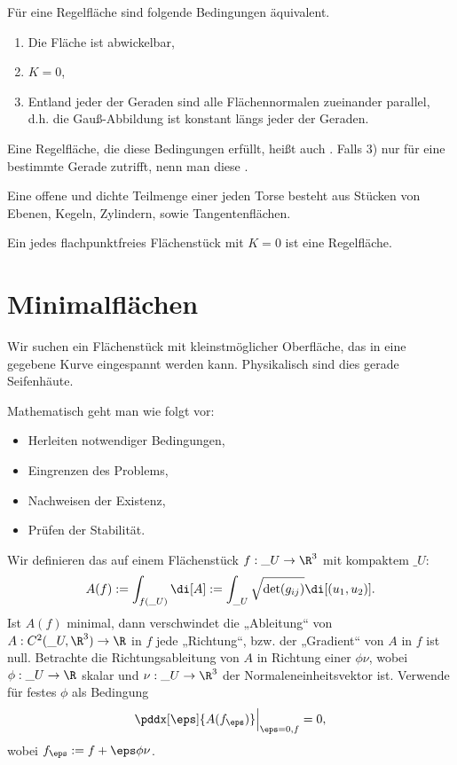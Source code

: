\begin{st}
	Für eine Regelfläche sind folgende Bedingungen äquivalent.
	\begin{enumerate}[1)]
		\item
			Die Fläche ist abwickelbar,
		\item
			$K = 0$,
		\item
			Entland jeder der Geraden sind alle Flächennormalen zueinander parallel, d.h. die Gauß-Abbildung ist konstant längs jeder der Geraden.
	\end{enumerate}
	Eine Regelfläche, die diese Bedingungen erfüllt, heißt auch .
	Falls 3) nur für eine bestimmte Gerade zutrifft, nenn man diese .

	Eine offene und dichte Teilmenge einer jeden Torse besteht aus Stücken von Ebenen, Kegeln, Zylindern, sowie Tangentenflächen.

	Ein jedes flachpunktfreies Flächenstück mit $K = 0$ ist eine Regelfläche.
\end{st}



\section{Minimalflächen}

Wir suchen ein Flächenstück mit kleinstmöglicher Oberfläche, das in eine gegebene Kurve eingespannt werden kann.
Physikalisch sind dies gerade Seifenhäute.

Mathematisch geht man wie folgt vor:
\begin{itemize}
	\item
		Herleiten notwendiger Bedingungen,
	\item
		Eingrenzen des Problems,
	\item
		Nachweisen der Existenz,
	\item
		Prüfen der Stabilität.
\end{itemize}

Wir definieren das  auf einem Flächenstück $f: \_U \to \R^3$ mit kompaktem $\_U$:
\[
	A(f) := \int_{f(\_U)} \di[A]
	:= \int_{\_U} \sqrt{\det (g_{ij})} \di[(u_1,u_2)].
\]
Ist $A(f)$ minimal, dann verschwindet die „Ableitung“ von $A: C^2(\_U, \R^3) \to \R$ in $f$ jede „Richtung“, bzw. der „Gradient“ von $A$ in $f$ ist null.
Betrachte die Richtungsableitung von $A$ in Richtung einer  $\phi \nu$, wobei $\phi: \_U \to \R$ skalar und $\nu: \_U \to \R^3$ der Normaleneinheitsvektor ist.
Verwende für festes $\phi$ als Bedingung
\[
	\pddx[\eps]{A(f_\eps)} \Big|_{\eps = 0, f} = 0,
\]
wobei $f_\eps := f + \eps \phi \nu$.

